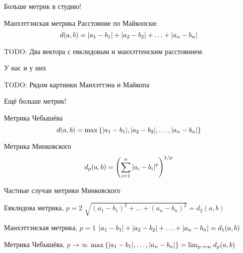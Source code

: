 \documentclass[14pt,xcolor=dvipsnames]{beamer}
\begin{document}
\begin{frame}{Больше метрик в студию!}
 \begin{block}{Манхэттэнская метрика}
  Расстояние по Майкопски:
  \[
  d(a, b) = \abs{a_1 - b_1}  + \abs{a_2 - b_2} + \ldots + \abs{a_n - b_n}
  \]
 \end{block}

\begin{block}{TODO:}
  Два вектора с евклидовым и манхэттенским расстоянием.
\end{block}
 
\end{frame}




\begin{frame}{У нас и у них}

 \begin{block}{TODO:}
 Рядом картинки Манхэттэна и Майкопа
 \end{block}

\end{frame}


\begin{frame}{Ещё больше метрик!}
\begin{block}{Метрика Чебышёва}
  \[
      d(a, b) = \max\left\{\abs{a_1 - b_1}, \abs{a_2 - b_2}, \ldots, \abs{a_n - b_n}\right\}
  \]
\end{block}
  
\begin{block}{Метрика Минковского}
  \[
      d_p(a, b) = \left(\sum_{i=1}^n\abs{a_i - b_i}^p\right)^{1/p}
  \]
\end{block}
\end{frame}

\begin{frame}{Частные случаи метрики Минковского}

\begin{block}{Евклидова метрика, $p=2$}
$
  \sqrt{(a_1 - b_1)^2 + \ldots + (a_n - b_n)^2} = d_2(a, b)
$
\end{block}

\begin{block}{Манхэттэнская метрика, $p=1$}
$
    \abs{a_1 - b_1}  + \abs{a_2 - b_2} + \ldots + \abs{a_n - b_n} = d_1(a, b)
$
\end{block}
  
\begin{block}{Метрика Чебышёва, $p\to \infty$}
$
    \max\left\{\abs{a_1 - b_1}, \ldots, \abs{a_n - b_n}\right\} = \lim_{p\to\infty} d_p(a, b)
$
\end{block}
\end{frame}
\end{document}
